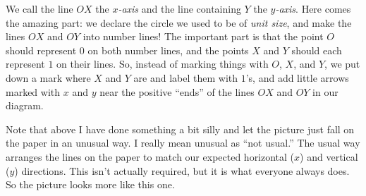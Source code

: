 \documentclass[00-livre-main.tex]{subfiles}
\begin{document}
\begin{figure}[h!]
\centering
{}
\end{figure}

We call the line $OX$ the \emph{$x$-axis} and the line containing $Y$ the \emph{$y$-axis}. Here comes the amazing part: we declare the circle we used to be of \emph{unit size}, and make the lines $OX$ and $OY$ into number lines! The important part is that the point $O$ should represent $0$ on both number lines, and the points $X$ and $Y$ should each represent $1$ on their lines. So, instead of marking things with $O$, $X$, and $Y$, we put down a mark where $X$ and $Y$ are and label them with $1$'s, and add little arrows marked with $x$ and $y$ near the positive ``ends'' of the lines $OX$ and $OY$ in our diagram.

\begin{figure}[h!]
\centering
{}
\end{figure}

Note that above I have done something a bit silly and let the picture just fall on the paper in an unusual way. I really mean unusual as ``not usual.'' The usual way arranges the lines on the paper to match our expected horizontal ($x$) and vertical ($y$) directions. This isn't actually required, but it is what everyone always does. So the picture looks more like this one.


\begin{figure}[h]
\centering
{}
\end{figure}
\end{document}
